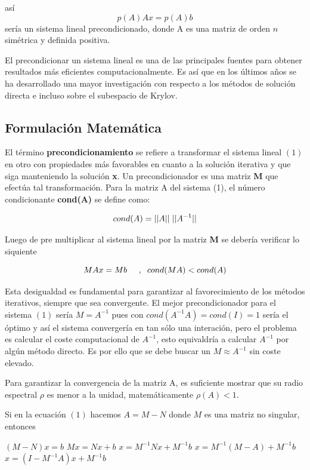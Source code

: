 \documentclass[11pt,letterpaper]{article}
\begin{document}
así  \[ p(A)Ax = p(A)b \] sería un sistema lineal precondicionado, donde A es una matriz de orden $n$ simétrica y definida positiva.

El precondicionar un sistema lineal es una de las principales fuentes para obtener resultados más eficientes computacionalmente. Es así que en los últimos años se ha desarrollado una mayor investigación con respecto a los métodos de solución directa e incluso sobre el subespacio de Krylov.


\subsection{Formulación Matemática}

El término \textbf{precondicionamiento} se refiere a transformar el sistema lineal $(1)$ en otro con propiedades más favorables en cuanto a la solución iterativa y que siga manteniendo la solución \textbf{x}. Un precondicionador es una matriz \textbf{M} que efectúa tal transformación. Para la matriz A del sistema (1), el número condicionante \textbf{cond(A)} se define como:

\vspace{0.1cm}
\[ 
	cond(A) = ||A|| \hspace{0.1cm} ||A^{-1}||
\]

Luego de pre multiplicar al sistema lineal por la matriz \textbf{M} se debería verificar lo siquiente

\[ 
	 MAx = Mb \hspace{0.5cm}, \hspace{0.2cm} cond(MA) < cond(A) 
\]

Esta desigualdad es fundamental para garantizar al favorecimiento de los métodos iterativos, siempre que sea convergente. El mejor precondicionador para el sistema $(1)$ sería $M = A^{-1}$ pues con $cond(A^{-1}A) = cond(I) = 1$ sería el óptimo y así el sistema convergería en tan sólo una interación, pero el problema es calcular el coste computacional de  $A^{-1}$, esto equivaldría a calcular \textbf{$A^{-1}$} por algún método directo. Es por ello que se debe buscar un \textbf{$M \approx A^{-1}$} sin coste elevado.

Para garantizar la convergencia de la matriz A, es suficiente mostrar que su radio espectral $\rho$ es menor a la unidad, matemáticamente  $\rho(A) < 1$. 

Si en la ecuación $(1)$ hacemos $A = M - N$ donde $M$ es una matriz no singular, entonces

\begin{center}
\bgroup\obeylines
$ (M - N)x = b $
$  Mx = Nx + b $
$  x = M^{-1}Nx + M^{-1}b $
$  x = M^{-1}(M - A) + M^{-1}b $
$  x = (I - M^{-1}A)x + M^{-1}b $
\egroup
\end{center}
\end{document}
